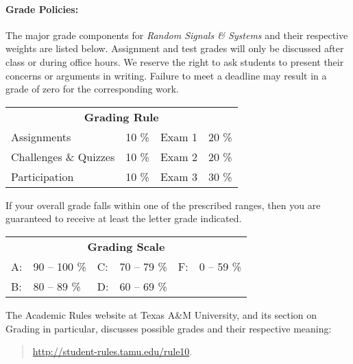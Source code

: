 \documentclass{article}
\begin{document}
%
\paragraph{Grade Policies:}
The major grade components for \emph{Random Signals \& Systems} and their respective weights are listed below.
Assignment and test grades will only be discussed after class or during office hours.
We reserve the right to ask students to present their concerns or arguments in writing.
Failure to meet a deadline may result in a grade of zero for the corresponding work.
\begin{center}
\begin{tabular}{lp{15mm}lp{15mm}}
\multicolumn{4}{c}{\textbf{Grading Rule}} \\
Assignments & 10 \% & Exam 1 & 20 \% \\
Challenges \& Quizzes & 10 \% & Exam 2 & 20 \% \\
Participation & 10 \% & Exam 3 & 30 \%
\end{tabular}
\end{center}
If your overall grade falls within one of the prescribed ranges, then you are guaranteed to receive at least the letter grade indicated.
\begin{center}
\begin{tabular}{lp{25mm}lp{25mm}lp{25mm}}
\multicolumn{6}{c}{\textbf{Grading Scale}} \\
A: & 90 -- 100 \% & C: & 70 -- 79 \% & F: & 0 -- 59 \% \\
B: & 80 -- 89 \% & D: & 60 -- 69 \%
\end{tabular}
\end{center}
The Academic Rules website at Texas A\&M University, and its section on Grading in particular, discusses possible grades and their respective meaning:
\begin{quote}
\url{http://student-rules.tamu.edu/rule10}.
\end{quote}


%
\end{document}
